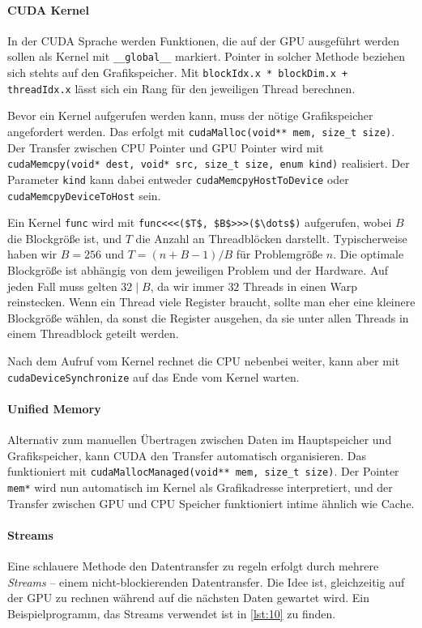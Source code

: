 \paragraph{CUDA Kernel}
In der CUDA Sprache werden Funktionen, die auf der GPU ausgeführt werden sollen als Kernel mit \lstinline|__global__| markiert.
Pointer in solcher Methode beziehen sich stehts auf den Grafikspeicher.
Mit \lstinline|blockIdx.x * blockDim.x + threadIdx.x| lässt sich ein Rang für den jeweiligen Thread berechnen.

Bevor ein Kernel aufgerufen werden kann, muss der nötige Grafikspeicher angefordert werden.
Das erfolgt mit \lstinline|cudaMalloc(void** mem, size_t size)|.
Der Transfer zwischen CPU Pointer und GPU Pointer wird mit \lstinline|cudaMemcpy(void* dest, void* src, size_t size, enum kind)| realisiert.
Der Parameter \lstinline|kind| kann dabei entweder \lstinline|cudaMemcpyHostToDevice| oder \lstinline|cudaMemcpyDeviceToHost| sein.

Ein Kernel \lstinline|func| wird mit \lstinline|func<<<($T$, $B$>>>($\dots$)| aufgerufen, wobei \(B\) die Blockgröße ist, und \(T\) die Anzahl an Threadblöcken darstellt.
Typischerweise haben wir \(B = 256\) und \(T = (n+B-1)/B\) für Problemgröße \(n\).
Die optimale Blockgröße ist abhängig von dem jeweiligen Problem und der Hardware.
Auf jeden Fall muss gelten \(32 \mid B\), da wir immer \(32\) Threads in einen Warp reinstecken.
Wenn ein Thread viele Register braucht, sollte man eher eine kleinere Blockgröße wählen, da sonst die Register ausgehen, da sie unter allen Threads in einem Threadblock geteilt werden.

Nach dem Aufruf vom Kernel rechnet die CPU nebenbei weiter, kann aber mit \lstinline|cudaDeviceSynchronize| auf das Ende vom Kernel warten.

\paragraph{Unified Memory}
Alternativ zum manuellen Übertragen zwischen Daten im Hauptspeicher und Grafikspeicher, kann CUDA den Transfer automatisch organisieren.
Das funktioniert mit \lstinline|cudaMallocManaged(void** mem, size_t size)|.
Der Pointer \lstinline|mem*| wird nun automatisch im Kernel als Grafikadresse interpretiert, und der Transfer zwischen GPU und CPU Speicher funktioniert intime ähnlich wie Cache.

\paragraph{Streams}
Eine schlauere Methode den Datentransfer zu regeln erfolgt durch mehrere \emph{Streams} -- einem nicht-blockierenden Datentransfer.
Die Idee ist, gleichzeitig auf der GPU zu rechnen während auf die nächsten Daten gewartet wird.
Ein Beispielprogramm, das Streams verwendet ist in \autoref{lst:10} zu finden.

